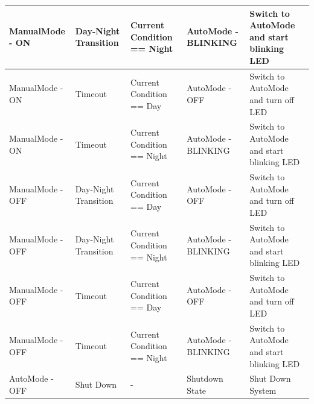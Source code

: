 {\begin{table}[H]
\begin{tabular}{|p{2.3cm}|p{3cm}|p{4cm}|p{2cm}|p{4cm}|}
ManualMode - ON                                                     & Day-Night Transition                                       & Current Condition == Night                                     & AutoMode - BLINKING                                             & Switch to AutoMode and start blinking LED \\ \hline
ManualMode - ON                                                     & Timeout                                                    & Current Condition == Day                                       & AutoMode - OFF                                                  & Switch to AutoMode and turn off LED       \\ \hline
ManualMode - ON                                                     & Timeout                                                    & Current Condition == Night                                     & AutoMode - BLINKING                                             & Switch to AutoMode and start blinking LED \\ \hline
ManualMode - OFF                                                    & Day-Night Transition                                       & Current Condition == Day                                       & AutoMode - OFF                                                  & Switch to AutoMode and turn off LED       \\ \hline
ManualMode - OFF                                                    & Day-Night Transition                                       & Current Condition == Night                                     & AutoMode - BLINKING                                             & Switch to AutoMode and start blinking LED \\ \hline
ManualMode - OFF                                                    & Timeout                                                    & Current Condition == Day                                       & AutoMode - OFF                                                  & Switch to AutoMode and turn off LED       \\ \hline
ManualMode - OFF                                                    & Timeout                                                    & Current Condition == Night                                     & AutoMode - BLINKING                                             & Switch to AutoMode and start blinking LED \\ \hline
AutoMode - OFF                                                      & Shut Down                                                  & -                                                              & Shutdown State                                                               & Shut Down System                          \\ \hline

\end{tabular}
\end{table}}
